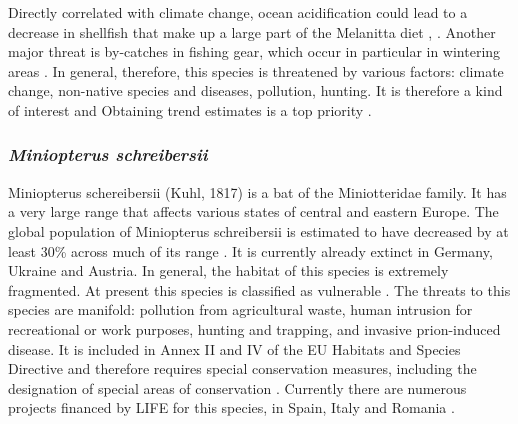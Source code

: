 \documentclass[12pt,a4paper]{article}
\begin{document}
Directly correlated with climate change, ocean acidification could lead to a decrease in shellfish that make up a large part of the Melanitta diet \citep{stein}, \citep{carb}.
Another major threat is by-catches in fishing gear, which occur in particular in wintering areas \citep*{dagys}.
In general, therefore, this species is threatened by various factors: climate change, non-native species and diseases, pollution, hunting.
It is therefore a kind of interest and Obtaining trend estimates is a top priority \citep{IUCN}.

\subsubsection{\textit{Miniopterus schreibersii}} %
Miniopterus schereibersii (Kuhl, 1817) is a bat of the Miniotteridae family.
It has a very large range that affects various states of central and eastern Europe.
The global population of Miniopterus schreibersii is estimated to have decreased by at least 30\% across much of its range \citep{IUCN}. It is currently already extinct in Germany, Ukraine and Austria. In general, the habitat of this species is extremely fragmented. At present this species is classified as vulnerable \citep{IUCN}.
The threats to this species are manifold: pollution from agricultural waste, human intrusion for recreational or work purposes, hunting and trapping, and invasive prion-induced disease.
It is included in Annex II and IV of the EU Habitats and Species Directive and therefore requires special conservation measures, including the designation of special areas of conservation \citep{dir}.
Currently there are numerous projects financed by LIFE for this species, in Spain, Italy and Romania \citep{IUCN}.
\end{document}
